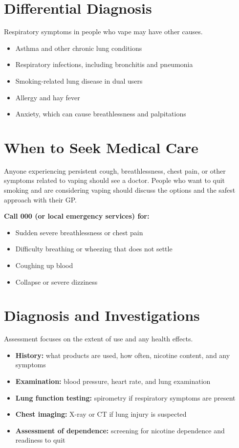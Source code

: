 \section*{Differential Diagnosis}
Respiratory symptoms in people who vape may have other causes.
\begin{itemize}
    \item Asthma and other chronic lung conditions
    \item Respiratory infections, including bronchitis and pneumonia
    \item Smoking-related lung disease in dual users
    \item Allergy and hay fever
    \item Anxiety, which can cause breathlessness and palpitations
\end{itemize}

\section*{When to Seek Medical Care}
Anyone experiencing persistent cough, breathlessness, chest pain, or other symptoms related to vaping should see a doctor. People who want to quit smoking and are considering vaping should discuss the options and the safest approach with their GP.

\textbf{Call 000 (or local emergency services) for:}
\begin{itemize}
    \item Sudden severe breathlessness or chest pain
    \item Difficulty breathing or wheezing that does not settle
    \item Coughing up blood
    \item Collapse or severe dizziness
\end{itemize}

\section*{Diagnosis and Investigations}
Assessment focuses on the extent of use and any health effects.
\begin{itemize}
    \item \textbf{History:} what products are used, how often, nicotine content, and any symptoms
    \item \textbf{Examination:} blood pressure, heart rate, and lung examination
    \item \textbf{Lung function testing:} spirometry if respiratory symptoms are present
    \item \textbf{Chest imaging:} X-ray or CT if lung injury is suspected
    \item \textbf{Assessment of dependence:} screening for nicotine dependence and readiness to quit
\end{itemize}

